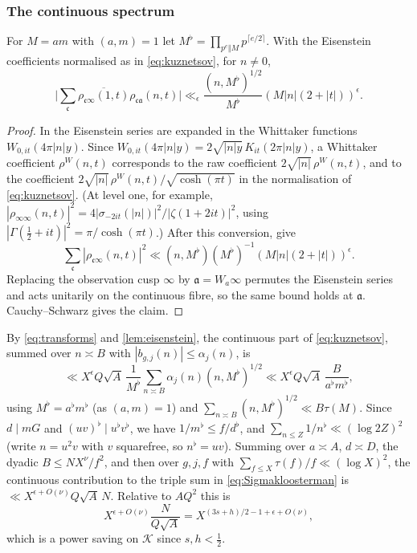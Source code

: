 \documentclass[11pt,colorlinks]{charlie}
\begin{document}
\subsubsection{The continuous spectrum}
\begin{lemma}\label{lem:eisenstein}
For $M=am$ with $(a,m)=1$ let $M^\flat=\prod_{p^e\Vert M}p^{\lceil e/2\rceil}$. With the Eisenstein coefficients normalised as in \eqref{eq:kuznetsov}, for $n\ne0$,
\[
 \Big|\sum_{\mathfrak c}\overline{\rho_{\mathfrak c\infty}(1,t)}\rho_{\mathfrak c\mathfrak a}(n,t)\Big|\ll_\epsilon\frac{(n,M^\flat)^{1/2}}{M^\flat}(M|n|(2+|t|))^\epsilon .
\]
\end{lemma}
\begin{proof}
In \cite{BM} the Eisenstein series are expanded in the Whittaker functions $W_{0,it}(4\pi|n|y)$. Since $W_{0,it}(4\pi|n|y)=2\sqrt{|n|y}\,K_{it}(2\pi|n|y)$, a Whittaker coefficient $\rho^W(n,t)$ corresponds to the raw coefficient $2\sqrt{|n|}\,\rho^W(n,t)$, and to the coefficient $2\sqrt{|n|}\,\rho^W(n,t)/\sqrt{\cosh(\pi t)}$ in the normalisation of \eqref{eq:kuznetsov}. (At level one, for example, $|\rho_{\infty\infty}(n,t)|^2=4|\sigma_{-2it}(|n|)|^2/|\zeta(1+2it)|^2$, using $|\Gamma(\frac12+it)|^2=\pi/\cosh(\pi t)$.) After this conversion, \cite[Lemma~1, (3.10), (4.6)]{BM} give
\[
 \sum_{\mathfrak c}|\rho_{\mathfrak c\infty}(n,t)|^2\ll(n,M^\flat)(M^\flat)^{-1}(M|n|(2+|t|))^\epsilon .
\] Replacing the observation cusp $\infty$ by $\mathfrak a=W_a\infty$ permutes the Eisenstein series and acts unitarily on the continuous fibre, so the same bound holds at $\mathfrak a$. Cauchy--Schwarz gives the claim.
\end{proof}

By \eqref{eq:transforms} and \cref{lem:eisenstein}, the continuous part of \eqref{eq:kuznetsov}, summed over $n\asymp B$ with $|b_{g,j}(n)|\le\alpha_j(n)$, is
\[
 \ll X^{\epsilon}Q\sqrt A\,\frac1{M^\flat}\sum_{n\asymp B}\alpha_j(n)(n,M^\flat)^{1/2}\ll X^\epsilon Q\sqrt A\,\frac B{a^\flat m^\flat},
\]
using $M^\flat=a^\flat m^\flat$ (as $(a,m)=1$) and $\sum_{n\asymp B}(n,M^\flat)^{1/2}\ll B\tau(M)$. Since $d\mid mG$ and $(uv)^\flat\mid u^\flat v^\flat$, we have $1/m^\flat\le f/d^\flat$, and $\sum_{n\le Z}1/n^\flat\ll(\log 2Z)^2$ (write $n=u^2v$ with $v$ squarefree, so $n^\flat=uv$). Summing over $a\asymp A$, $d\asymp D$, the dyadic $B\le NX^\nu/f^2$, and then over $g,j,f$ with $\sum_{f\le X}\tau(f)/f\ll(\log X)^2$, the continuous contribution to the triple sum in \eqref{eq:Sigmakloosterman} is $\ll X^{\epsilon+O(\nu)}Q\sqrt A\,N$. Relative to $AQ^2$ this is
\begin{equation}\label{eq:continuousbound}
 X^{\epsilon+O(\nu)}\frac N{Q\sqrt A}=X^{(3s+h)/2-1+\epsilon+O(\nu)},
\end{equation}
which is a power saving on $\mathcal K$ since $s,h<\frac12$.
\end{document}
